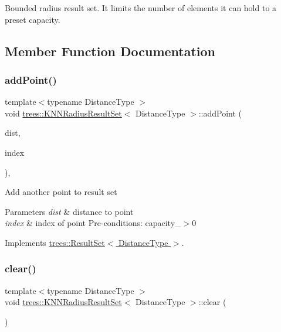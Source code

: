 Bounded radius result set. It limits the number of elements it can hold to a preset capacity. 

\subsection{Member Function Documentation}
\mbox{\label{classtrees_1_1_k_n_n_radius_result_set_af19b65b3e39f5ef1715a1d7cb4afc8c5}} 
\subsubsection{\texorpdfstring{add\+Point()}{addPoint()}}
{\footnotesize\ttfamily template$<$typename Distance\+Type $>$ \\
void \hyperlink{classtrees_1_1_k_n_n_radius_result_set}{trees\+::\+K\+N\+N\+Radius\+Result\+Set}$<$ Distance\+Type $>$\+::add\+Point (\begin{DoxyParamCaption}\item[{Distance\+Type}]{dist,  }\item[{size\+\_\+t}]{index }\end{DoxyParamCaption})\hspace{0.3cm}{\ttfamily [inline]}, {\ttfamily [virtual]}}

Add another point to result set 
\begin{DoxyParams}{Parameters}
{\em dist} & distance to point \\
\hline
{\em index} & index of point Pre-\/conditions\+: capacity\+\_\+$>$0 \\
\hline
\end{DoxyParams}


Implements \hyperlink{classtrees_1_1_result_set}{trees\+::\+Result\+Set$<$ Distance\+Type $>$}.

\mbox{\label{classtrees_1_1_k_n_n_radius_result_set_afc08b678752c4fb938a12a6346a3123f}} 
\subsubsection{\texorpdfstring{clear()}{clear()}}
{\footnotesize\ttfamily template$<$typename Distance\+Type $>$ \\
void \hyperlink{classtrees_1_1_k_n_n_radius_result_set}{trees\+::\+K\+N\+N\+Radius\+Result\+Set}$<$ Distance\+Type $>$\+::clear (\begin{DoxyParamCaption}{ }\end{DoxyParamCaption})\hspace{0.3cm}{\ttfamily [inline]}}

